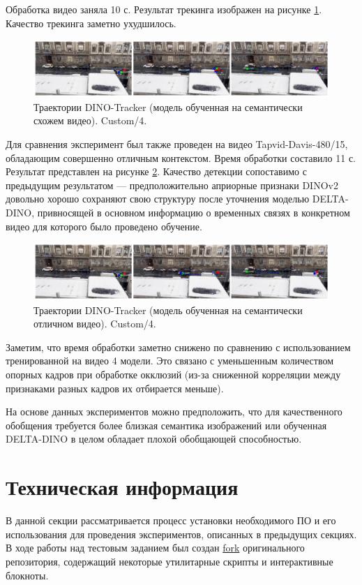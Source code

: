 \documentclass[a4paper, 14pt]{extarticle}
\theoremstyle{definition}
\theoremstyle{plain}
\theoremstyle{remark}
\begin{document}
Обработка видео заняла 10 с. Результат трекинга изображен на рисунке \ref{fig:custom-4-sem}. Качество трекинга заметно ухудшилось.
\begin{figure}
    [H]
    \centering
    \includegraphics[width=\textwidth]{figs/custom-4-sem.png}
    \caption{Траектории DINO-Tracker (модель обученная на семантически схожем видео). Custom/4.}
    \label{fig:custom-4-sem}
\end{figure}

Для сравнения эксперимент был также проведен на видео Tapvid-Davis-480/15, обладающим совершенно отличным контекстом. Время обработки составило 11 с. Результат представлен на рисунке \ref{fig:custom-4-bad-sem}. Качество детекции сопоставимо с предыдущим результатом --- предположительно априорные признаки DINOv2 довольно хорошо сохраняют свою структуру после уточнения моделью DELTA-DINO, привносящей в основном информацию о временных связях в конкретном видео для которого было проведено обучение.
\begin{figure}
    [H]
    \centering
    \includegraphics[width=\textwidth]{figs/custom-4-bad-sem.png}
    \caption{Траектории DINO-Tracker (модель обученная на семантически отличном видео). Custom/4.}
    \label{fig:custom-4-bad-sem}
\end{figure}

Заметим, что время обработки заметно снижено по сравнению с использованием тренированной на видео 4 модели. Это связано с уменьшенным количеством опорных кадров при обработке окклюзий (из-за сниженной корреляции между признаками разных кадров их отбирается меньше).

На основе данных экспериментов можно предположить, что для качественного обобщения требуется более близкая семантика изображений или обученная DELTA-DINO в целом обладает плохой обобщающей способностью.

\newpage


\section{Техническая информация} 
В данной секции рассматривается процесс установки необходимого ПО и его использования для проведения экспериментов, описанных в предыдущих секциях. В ходе работы над тестовым заданием был создан \href{https://github.com/diuzhevVlad/dino-tracker-assignment.git}{fork} оригинального репозитория, содержащий некоторые утилитарные скрипты и интерактивные блокноты. 
\end{document}
